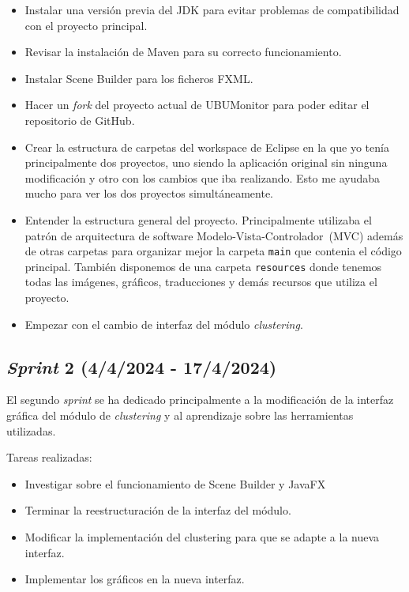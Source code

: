 \begin{itemize}
    \item Instalar una versión previa del JDK para evitar problemas de compatibilidad con el proyecto principal.
    \item Revisar la instalación de Maven para su correcto funcionamiento.
    \item Instalar Scene Builder para los ficheros FXML.
    \item Hacer un \emph{fork} del proyecto actual de UBUMonitor para poder editar el repositorio de GitHub.
    \item Crear la estructura de carpetas del workspace de Eclipse en la que yo tenía principalmente dos proyectos, uno siendo la aplicación original sin ninguna modificación y otro con los cambios que iba realizando. Esto me ayudaba mucho para ver los dos proyectos simultáneamente.
    \item Entender la estructura general del proyecto. Principalmente utilizaba el patrón de arquitectura de software Modelo-Vista-Controlador~(MVC) además de otras carpetas para organizar mejor la carpeta \texttt{main} que contenia el código principal. También disponemos de una carpeta \texttt{resources} donde tenemos todas las imágenes, gráficos, traducciones y demás recursos que utiliza el proyecto.
    \item Empezar con el cambio de interfaz del módulo \emph{clustering}.
\end{itemize}

\subsection{\emph{Sprint} 2 (4/4/2024 - 17/4/2024)}

El segundo \emph{sprint} se ha dedicado principalmente a la modificación de la interfaz gráfica del módulo de \emph{clustering} y al aprendizaje sobre las herramientas utilizadas.

Tareas realizadas:

\begin{itemize}
    \item Investigar sobre el funcionamiento de Scene Builder y JavaFX
    \item Terminar la reestructuración de la interfaz del módulo.
    \item Modificar la implementación del clustering para que se adapte a la nueva interfaz.
    \item Implementar los gráficos en la nueva interfaz.   
\end{itemize}


